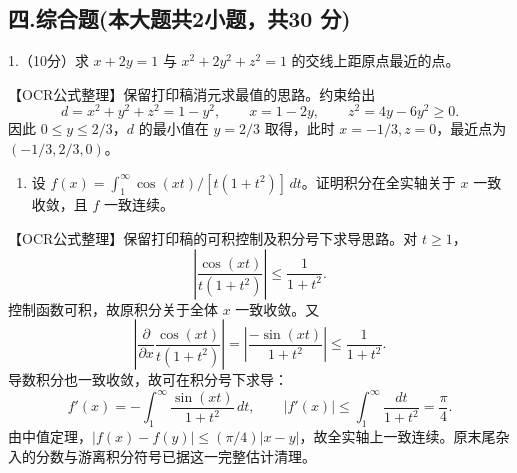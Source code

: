 \documentclass[11pt,fontset=fandol]{ctexart}
\providecommand{\tightlist}{\setlength{\itemsep}{0pt}\setlength{\parskip}{0pt}}
\begin{document}
\subsection{四.综合题(本大题共2小题，共30
分)}\label{ux56db.ux7efcux5408ux9898ux672cux5927ux9898ux51712ux5c0fux9898ux517130-ux5206}

1.（10分）求 \(x+2y=1\) 与 \(x^2+2y^2+z^2=1\) 的交线上距原点最近的点。

【OCR公式整理】保留打印稿消元求最值的思路。约束给出 \[
d=x^2+y^2+z^2=1-y^2,\qquad x=1-2y,\qquad
z^2=4y-6y^2\ge0.
\] 因此 \(0\le y\le2/3\)，\(d\) 的最小值在 \(y=2/3\) 取得，此时
\(x=-1/3,z=0\)，最近点为 \((-1/3,2/3,0)\)。

\begin{enumerate}
\def\labelenumi{\arabic{enumi}.}
\setcounter{enumi}{1}
\tightlist
\item
  设 \(f(x)=\int_1^\infty\cos(xt)/[t(1+t^2)]\,dt\)。证明积分在全实轴关于
  \(x\) 一致收敛，且 \(f\) 一致连续。
\end{enumerate}

【OCR公式整理】保留打印稿的可积控制及积分号下求导思路。对 \(t\ge1\)， \[
\left|\frac{\cos(xt)}{t(1+t^2)}\right|\le\frac1{1+t^2}.
\] 控制函数可积，故原积分关于全体 \(x\) 一致收敛。又 \[
\left|\frac{\partial}{\partial x}
\frac{\cos(xt)}{t(1+t^2)}\right|
=\left|\frac{-\sin(xt)}{1+t^2}\right|
\le\frac1{1+t^2}.
\] 导数积分也一致收敛，故可在积分号下求导： \[
f'(x)=-\int_1^\infty\frac{\sin(xt)}{1+t^2}\,dt,\qquad
|f'(x)|\le\int_1^\infty\frac{dt}{1+t^2}=\frac\pi4.
\]
由中值定理，\(|f(x)-f(y)|\le(\pi/4)|x-y|\)，故全实轴上一致连续。原末尾杂入的分数与游离积分符号已据这一完整估计清理。
\end{document}
